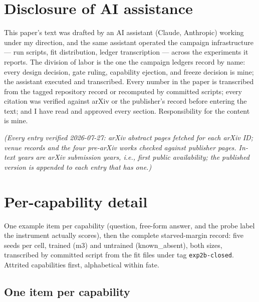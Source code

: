 \section*{Disclosure of AI assistance}

This paper's text was drafted by an AI assistant (Claude, Anthropic)
working under my direction, and the same assistant operated the
campaign infrastructure --- run scripts, fit distribution, ledger
transcription --- across the experiments it reports. The division of
labor is the one the campaign ledgers record by name: every design
decision, gate ruling, capability ejection, and freeze decision is
mine; the assistant executed and transcribed. Every number in the
paper is transcribed from the tagged repository record or recomputed
by committed scripts; every citation was verified against arXiv or
the publisher's record before entering the text; and I have read and
approved every section. Responsibility for the content is mine.

\emph{(Every entry verified 2026-07-27: arXiv abstract pages fetched for
each arXiv ID; venue records and the four pre-arXiv works checked
against publisher pages. In-text years are arXiv submission years,
i.e., first public availability; the published version is appended to
each entry that has one.)}




\appendix
\section{Per-capability detail}\label{appendix-a}

One example item per capability (question, free-form answer, and the
probe label the instrument actually scores), then the complete
starved-margin record: five seeds per cell, trained (m3) and untrained
(known\_absent), both sizes, transcribed by committed script from the
fit files under tag \texttt{exp2b-closed}. Attrited capabilities first,
alphabetical within fate.

\subsection{One item per capability}\label{a.1-one-item-per-capability}

